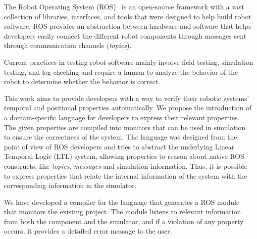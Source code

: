 \documentclass[runningheads]{llncs}
\begin{document}
The Robot Operating System (ROS)~\cite{quigley2009ros} is an open-source framework with a vast collection of libraries, interfaces, and tools that were designed to help build robot software. ROS provides an abstraction between hardware and software that helps developers easily connect the different robot components through messages sent through communication channels (\textit{topics}).

Current practices in testing robot software mainly involve field testing, simulation testing, and log checking and require a human to analyze the behavior of the robot to determine whether the behavior is correct.








This work aims to provide developers with a way to verify their robotic systems' temporal and positional properties automatically. We propose the introduction of a domain-specific language for developers to express their relevant properties. The given properties are compiled into monitors that can be used in simulation to ensure the correctness of the system. The language was designed from the point of view of ROS developers and tries to abstract the underlying Linear Temporal Logic (LTL) system, allowing properties to reason about native ROS constructs, like \textit{topics}, \textit{messages} and simulation information. Thus, it is possible to express properties that relate the internal information of the system with the corresponding information in the simulator.

We have developed a compiler for the language that generates a ROS module that monitors the existing project. The module listens to relevant information from both the component  and the simulator, and if a violation of any property occurs, it provides a detailed error message to the user.
\end{document}
